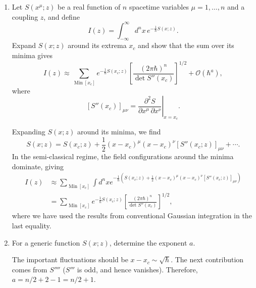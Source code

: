 \begin{enumerate}[label=\alph*)]
    \item Let $S(x^\mu;z)$ be a real function of $n$ spacetime variables
    $\mu=1,\ldots,n$ and a coupling $z$, and define
    \begin{equation}
        I(z)
        =\int_{-\infty}^{\infty}d^n x\,
        e^{-\frac{1}{\hbar}S(x;z)}.
    \end{equation}
    Expand $S(x;z)$ around its extrema $x_c$ and show that the sum over its
    minima gives
    \begin{equation}
        I(z)
        \approx
        \sum_{\operatorname{Min}[x_c]}
        e^{-\frac{1}{\hbar}S(x_c;z)}
        \left[
            \frac{(2\pi\hbar)^n}{\det S''(x_c)}
        \right]^{1/2}
        +\mathcal O(\hbar^a),
    \end{equation}
    where
    \begin{equation}
        \left[S''(x_c)\right]_{\mu\nu}
        =\left.
        \frac{\partial^2S}{\partial x^\mu\,\partial x^\nu}
        \right|_{x=x_c}.
    \end{equation}
    \begin{solution}
        Expanding $S(x;z)$ around its minima, we find
        \begin{equation}
            S(x;z) = S(x_c;z) + \frac{1}{2}(x-x_c)^\mu (x-x_c)^\nu [S''(x_c;z)]_{\mu\nu} + \cdots.
        \end{equation}
        In the semi-classical regime, the field configurations around the minima dominate, giving
        \begin{equation}
        \begin{aligned}
            I(z) &\approx \sum_{\operatorname{Min}[x_c]}\int d^nx e^{-\frac{1}{\hbar}(S(x_c;z) + \frac{1}{2}(x-x_c)^\mu (x-x_c)^\nu [S''(x_c;z)]_{\mu\nu})}\\
            &=\sum_{\operatorname{Min}[x_c]} e^{-\frac{1}{\hbar}S(x_c;z)}\left[
            \frac{(2\pi\hbar)^n}{\det S''(x_c)}
        \right]^{1/2},
        \end{aligned}
        \end{equation}
        where we have used the results from conventional Gaussian integration in the last equality.
    \end{solution}

    \item For a generic function $S(x;z)$, determine the exponent $a$.
    \begin{solution}
        The important fluctuations should be $x-x_c \sim \sqrt{\hbar}$. The next contribution comes from $S''''$ ($S'''$ is odd, and hence vanishes). Therefore, $a = n/2 +2 - 1 = n/2 +1$.
    \end{solution}


\end{enumerate}
